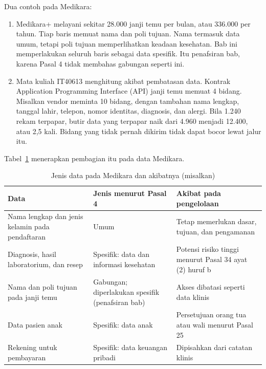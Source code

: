 Dua contoh pada Medikara:
\begin{enumerate}
  \item Medikara+ melayani sekitar 28.000 janji temu per bulan, atau 336.000 per tahun. Tiap baris
  memuat nama dan poli tujuan. Nama termasuk data umum, tetapi poli tujuan memperlihatkan keadaan
  kesehatan. Bab ini memperlakukan seluruh baris sebagai data spesifik. Itu penafsiran bab, karena
  Pasal 4 tidak membahas gabungan seperti ini.
  \item Mata kuliah IT40613 menghitung akibat pembatasan data. Kontrak Application Programming
  Interface (API) janji temu memuat 4 bidang. Misalkan vendor meminta 10 bidang, dengan tambahan
  nama lengkap, tanggal lahir, telepon, nomor identitas, diagnosis, dan alergi. Bila 1.240 rekam
  terpapar, butir data yang terpapar naik dari 4.960 menjadi 12.400, atau 2,5 kali. Bidang yang
  tidak pernah dikirim tidak dapat bocor lewat jalur itu.
\end{enumerate}

Tabel~\ref{tab:ch07-jenis-data} menerapkan pembagian itu pada data Medikara.

\begin{table}[!htb]
  \centering\small
  \caption{Jenis data pada Medikara dan akibatnya (misalkan)}\label{tab:ch07-jenis-data}
  \begin{tabularx}{\textwidth}{|>{\raggedright\arraybackslash}X|>{\raggedright\arraybackslash}p{}|>{\raggedright\arraybackslash}X|}
    \hline
    \textbf{Data} & \textbf{Jenis menurut Pasal 4} & \textbf{Akibat pada pengelolaan} \\ \hline
    Nama lengkap dan jenis kelamin pada pendaftaran & Umum & Tetap memerlukan dasar, tujuan, dan
    pengamanan \\ \hline
    Diagnosis, hasil laboratorium, dan resep & Spesifik: data dan informasi kesehatan & Potensi
    risiko tinggi menurut Pasal 34 ayat (2) huruf b \\ \hline
    Nama dan poli tujuan pada janji temu & Gabungan; diperlakukan spesifik (penafsiran bab) & Akses
    dibatasi seperti data klinis \\ \hline
    Data pasien anak & Spesifik: data anak & Persetujuan orang tua atau wali menurut Pasal 25 \\
    \hline
    Rekening untuk pembayaran & Spesifik: data keuangan pribadi & Dipisahkan dari catatan klinis
    \\ \hline
  \end{tabularx}
\end{table}

